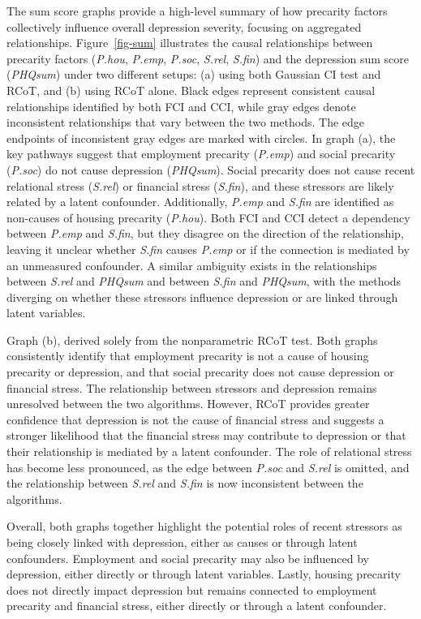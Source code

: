 \documentclass[
]{article}
\begin{document}
The sum score graphs provide a high-level summary of how precarity
factors collectively influence overall depression severity, focusing on
aggregated relationships. Figure~\ref{fig-sum} illustrates the causal
relationships between precarity factors (\emph{P.hou}, \emph{P.emp},
\emph{P.soc}, \emph{S.rel}, \emph{S.fin}) and the depression sum score
(\emph{PHQsum}) under two different setups: (a) using both Gaussian CI
test and RCoT, and (b) using RCoT alone. Black edges represent
consistent causal relationships identified by both FCI and CCI, while
gray edges denote inconsistent relationships that vary between the two
methods. The edge endpoints of inconsistent gray edges are marked with
circles. In graph (a), the key pathways suggest that employment
precarity (\emph{P.emp}) and social precarity (\emph{P.soc}) do not
cause depression (\emph{PHQsum}). Social precarity does not cause recent
relational stress (\emph{S.rel}) or financial stress (\emph{S.fin}), and
these stressors are likely related by a latent confounder. Additionally,
\emph{P.emp} and \emph{S.fin} are identified as non-causes of housing
precarity (\emph{P.hou}). Both FCI and CCI detect a dependency between
\emph{P.emp} and \emph{S.fin}, but they disagree on the direction of the
relationship, leaving it unclear whether \emph{S.fin} causes
\emph{P.emp} or if the connection is mediated by an unmeasured
confounder. A similar ambiguity exists in the relationships between
\emph{S.rel} and \emph{PHQsum} and between \emph{S.fin} and
\emph{PHQsum}, with the methods diverging on whether these stressors
influence depression or are linked through latent variables.

Graph (b), derived solely from the nonparametric RCoT test. Both graphs
consistently identify that employment precarity is not a cause of
housing precarity or depression, and that social precarity does not
cause depression or financial stress. The relationship between stressors
and depression remains unresolved between the two algorithms. However,
RCoT provides greater confidence that depression is not the cause of
financial stress and suggests a stronger likelihood that the financial
stress may contribute to depression or that their relationship is
mediated by a latent confounder. The role of relational stress has
become less pronounced, as the edge between \emph{P.soc} and
\emph{S.rel} is omitted, and the relationship between \emph{S.rel} and
\emph{S.fin} is now inconsistent between the algorithms.

Overall, both graphs together highlight the potential roles of recent
stressors as being closely linked with depression, either as causes or
through latent confounders. Employment and social precarity may also be
influenced by depression, either directly or through latent variables.
Lastly, housing precarity does not directly impact depression but
remains connected to employment precarity and financial stress, either
directly or through a latent confounder.
\end{document}
